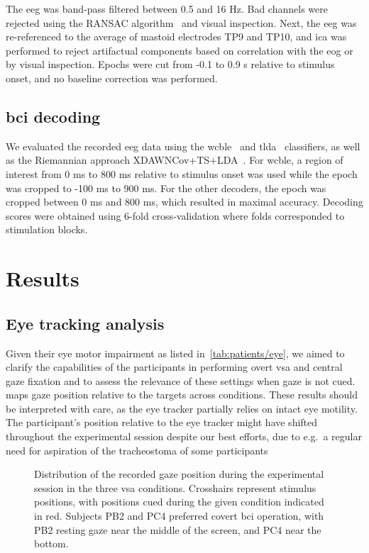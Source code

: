 \documentclass[twocolumn]{article}
\begin{document}
The \ac{eeg} was band-pass filtered between 0.5 and 16 Hz.
Bad channels were rejected using the RANSAC algorithm~\cite{Fischler1981}
and visual inspection.
Next, the \ac{eeg} was re-referenced to the average of mastoid electrodes TP9
and TP10, and \ac{ica} was performed to reject artifactual components based on
correlation with the \ac{eog} or by visual inspection.
Epochs were cut from -0.1 to 0.9 s relative to stimulus onset, and no baseline
correction was performed.

\subsection{\Acs{bci} decoding}

We evaluated the recorded \ac{eeg} data using the \ac{wcble}~\cite{VanDenKerchove2024}
and \ac{tlda}~\cite{Sosulski2022}
classifiers, as well as the Riemannian approach XDAWNCov+TS+LDA~\cite{Cecotti2017}.
For \ac{wcble}, a region of interest from 0 ms to 800 ms relative to stimulus
onset was used while the epoch was cropped to -100 ms to 900 ms. For the other
decoders, the epoch was cropped between 0 ms and 800 ms, which resulted in maximal
accuracy.
Decoding scores were obtained using 6-fold cross-validation where folds corresponded to
stimulation blocks.

\section{Results}



\subsection{Eye tracking analysis}
\label{sec:patients/outcomes/gaze}
Given their eye motor impairment as listed in~\cref{tab:patients/eye}, we aimed to clarify the
capabilities of the participants in performing overt \ac{vsa} and central gaze fixation and to
assess the relevance of these settings when gaze is not cued.
 maps gaze position relative to the targets
across conditions.
These results should be interpreted with care, as the eye tracker partially
relies on intact eye motility.
The participant's position relative to the eye tracker might have shifted
throughout the experimental session despite our best efforts, due to e.g.\ a
regular need for aspiration of the tracheostoma of some participants
\begin{figure}
	\caption{%
		Distribution of the recorded gaze position during the experimental session in the three \ac{vsa}
		conditions.
		Crosshairs represent stimulus positions, with positions cued during
		the given condition indicated in red.
		Subjects PB2 and PC4 preferred covert \ac{bci} operation, with PB2 resting gaze
		near the middle of the screen, and PC4 near the bottom.
	}%
	\label{fig:patients/gaze}
\end{figure}
\end{document}
